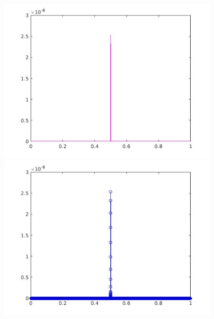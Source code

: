 \documentclass[a4paper,11pt]{article}
\begin{document}
\begin{figure}[!hp]
\centering
\begin{minipage}{.5\textwidth}
  \centering
  \includegraphics[width=1\linewidth]{images/lab2_85.jpg}
\end{minipage}%
\begin{minipage}{.5\textwidth}
  \centering
  \includegraphics[width=1\linewidth]{images/lab2_86.jpg}
\end{minipage}
\end{figure}
\end{document}
